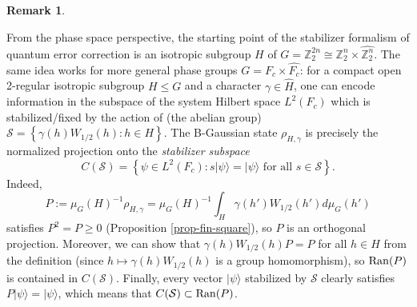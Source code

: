 \documentclass[12pt,reqno]{amsart}
\theoremstyle{definition}
\theoremstyle{definition}
\theoremstyle{definition}
\newtheorem{rem}[thm]{Remark}
\numberwithin{thm}{section}
\numberwithin{equation}{section}
\newcommand{\set}[1]{\left\{#1\right\}}
\newcommand{\ra}{\rangle}
\newcommand{\z}{\mathbb{Z}}
\begin{document}
\begin{rem} \label{rem-stabilizer}

From the phase space perspective, the starting point of the stabilizer formalism of quantum error correction \cite{CRSS,Got2} is an isotropic subgroup $H$ of $G=\z_2^{2n}\cong \z_2^n\times \widehat{\z_2^n}$. The same idea works for more general phase groups $G=F_c\times \widehat{F_c}$: for a compact open 2-regular isotropic subgroup $H\leq G$ and a character $\gamma\in \widehat{H}$, one can encode information in the subspace of the system Hilbert space $L^2(F_c)$ which is stabilized/fixed by the action of (the abelian group) $\mathcal{S}=\set{\gamma(h)W_{1/2}(h):h\in H}$. The B-Gaussian state $\rho_{H,\gamma}$ is precisely the normalized projection onto the \textit{stabilizer subspace} 
    $$C(\mathcal{S})=\set{\psi\in L^2(F_c): s|\psi\ra=|\psi\ra \text{ for all } s\in \mathcal{S}}.$$
Indeed, 
$$P:={\mu_G(H)}^{-1}\rho_{H,\gamma}={\mu_G(H)}^{-1}\int_H\gamma(h')W_{1/2}(h')d\mu_G(h')$$
satisfies $P^2=P\geq 0$ (Proposition \ref{prop-fin-square}), so $P$ is an orthogonal projection. Moreover, we can show that $\gamma(h)W_{1/2}(h)P=P$ for all $h\in H$ from the definition (since $h\mapsto \gamma(h)W_{1/2}(h)$ is a group homomorphism), so ${\rm Ran}(P)$ is contained in $C(\mathcal{S})$. Finally, every vector $|\psi\ra$ stabilized by $\mathcal{S}$ clearly satisfies $P|\psi\ra=|\psi\ra$, which means that $C(\mathcal{S})\subset {\rm Ran}(P)$.

\end{rem}
\end{document}
